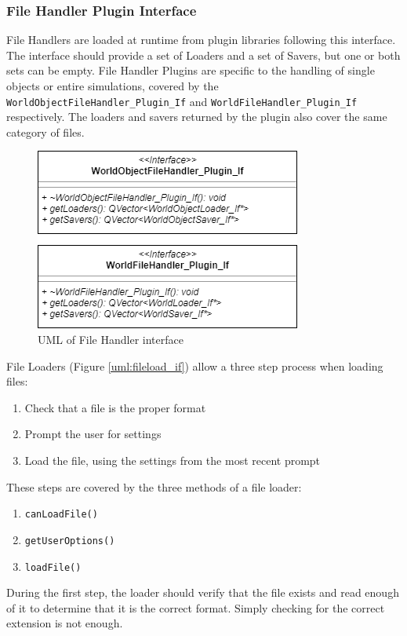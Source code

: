   \subsubsection*{File Handler Plugin Interface}
  File Handlers are loaded at runtime from plugin libraries following this interface. The interface should provide a set of Loaders and a set of Savers, but one or both sets can be empty. File Handler Plugins are specific to the handling of single objects or entire simulations, covered by the \lstinline|WorldObjectFileHandler_Plugin_If| and \lstinline|WorldFileHandler_Plugin_If| respectively. The loaders and savers returned by the plugin also cover the same category of files.
   \begin{figure}
 	\begin{center}
 	\includegraphics[scale=0.5]{./images_design/uml/FileHandler_If}
 	\caption{UML of File Handler interface\label{uml:filehandle_if}}
 	\end{center}
 \end{figure}
 File Loaders (Figure \ref{uml:fileload_if}) allow a three step process when loading files:
 \begin{enumerate}
	\item Check that a file is the proper format
	\item Prompt the user for settings
	\item Load the file, using the settings from the most recent prompt
 \end{enumerate}
 These steps are covered by the three methods of a file loader:
 \begin{enumerate}
	\item \lstinline|canLoadFile()|
	\item \lstinline|getUserOptions()|
	\item \lstinline|loadFile()|
 \end{enumerate}
 During the first step, the loader should verify that the file exists and read enough of it to determine that it is the correct format. Simply checking for the correct extension is not enough.

